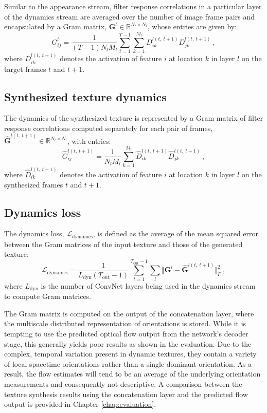 {Similar to the appearance stream, filter response correlations
in a particular layer of the dynamics
stream are averaged over the number of image frame
pairs and encapsulated by a Gram matrix,
$\mathbf{G}^{l} \in \mathbb{R}^{N_l \times N_l}$,
whose entries are given by:
\begin{equation}
	G_{ij}^l = \frac{1}{(T-1) N_l M_l} \sum_{t=1}^{T-1} \sum_{k=1}^{M_l} D_{ik}^{l(t,\ t+1)} D_{jk}^{l(t,\ t+1)}\ ,	
\end{equation}
where $D_{ik}^{l(t,\ t+1)}$ denotes the activation of feature $i$ at
location $k$ in layer $l$ on the target frames $t$ and $t+1$.

\subsection{Synthesized texture dynamics}

The dynamics of the synthesized texture is represented
by a Gram matrix of filter response correlations 
computed separately for each pair of frames,
$\hat{\mathbf{G}}^{l(t,\ t+1)} \in \mathbb{R}^{N_l \times N_l}$,
with entries:
\begin{equation}
	\hat{G}_{ij}^{l(t,\ t+1)} = \frac{1}{N_l M_l} \sum_{k=1}^{M_l} \hat{D}_{ik}^{l(t,\ t+1)} \hat{D}_{jk}^{l(t,\ t+1)}\ ,	
\end{equation}
where $\hat{D}_{ik}^{l(t,\ t+1)}$ denotes the activation of feature $i$ at
location $k$ in layer $l$ on the synthesized frames $t$ and $t+1$.

\subsection{Dynamics loss}

The dynamics loss, $\mathcal{L}_\text{dynamics}$, is defined as
the average of the mean squared error between the Gram matrices
of the input texture
and those of the generated texture:
\begin{equation}
   \mathcal{L}_\text{dynamics} = \frac{1}{L_\text{dyn} (T_\text{out}-1)}\sum_{t=1}^{T_\text{out}-1} \sum_{l}  \Vert \mathbf{G}^l - \hat{\mathbf{G}}^{l(t,\ t+1)}\Vert^2_F\ , \label{eq:dynloss}
\end{equation}
where $L_\text{dyn}$ is the number of ConvNet layers being used
in the dynamics stream to compute Gram matrices.

The Gram matrix is computed on the output of the concatenation layer,
where the multiscale distributed representation of orientations is
stored. While it is tempting to use the predicted optical flow output from the
network's decoder stage, this generally yields poor results as shown in the evaluation.
Due to the complex, temporal variation present in dynamic
textures, they contain a variety of local spacetime
orientations rather than a single dominant orientation.
As a result, the flow estimates will tend to be an average of the
underlying  orientation measurements and consequently not
descriptive. A comparison between the texture synthesis results using the concatenation layer and the predicted flow output is provided in Chapter \ref{chap:evaluation}.

}
